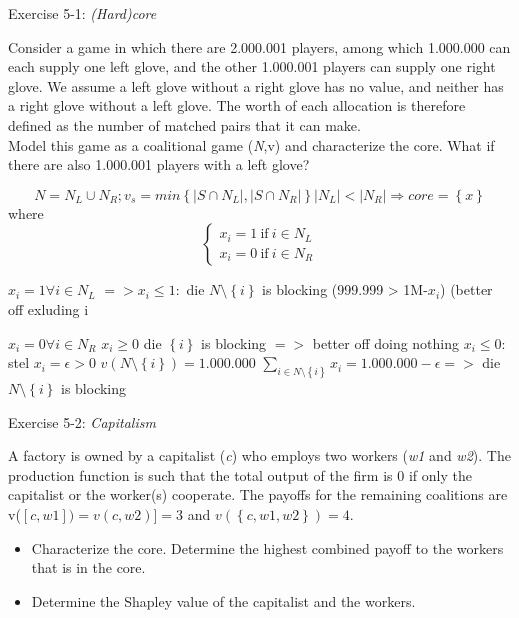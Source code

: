 \documentclass[../main.tex]{subfiles}
\begin{document}

\begin{question}
Exercise 5-1: \textit{(Hard)core}

Consider a game in which there are 2.000.001 players, among which 1.000.000 can each supply one left glove, and the other 1.000.001 players can supply one right glove. We assume a left glove without a right glove has no value, and neither has a right glove without a left glove. The worth of each allocation is therefore defined as the number of matched pairs that it can make.\\

Model this game as a coalitional game (\textit{N},v) and characterize the core. What if there are also 1.000.001 players with a left glove?

\end{question}

\begin{solution} 
\[
N = N_L \cup N_R; v_s = min \left\{ |S \cap N_L|, |S \cap N_R| \right\}
|N_L| < |N_R| \Rightarrow core = \left\{x\right\} 
\]
where 
\[
\begin{cases}
 x_i = 1 ~ \text{if} ~ i \in N_L \\
 x_i = 0 ~ \text{if} ~ i \in N_R
\end{cases}
\]


$x_i = 1 \forall i \in N_L$
$=> x_i \leq 1:$ die $N \setminus \left\{i\right\}$ is blocking (999.999 > 1M-$x_i$) (better off exluding i

$x_i = 0 \forall i \in N_R$
	$x_i \geq 0$ die $\left\{i\right\}$ is blocking $=>$ better off doing nothing
	$x_i \leq 0$: 
		stel $x_i = \epsilon > 0$
			$v(N \setminus \left\{i\right\}) = 1.000.000$
			$\sum_{i \in N\setminus\left\{i\right\}} x_i = 1.000.000 - \epsilon =>$ die $N\setminus\left\{i\right\}$ is blocking
\end{solution}

\begin{question}
    Exercise 5-2: \textit{Capitalism}

A factory is owned by a capitalist (\textit{c}) who employs two workers (\textit{w1} and \textit{w2}). The production function is such that the total output of the firm is 0 if only the capitalist or the worker(s) cooperate. The payoffs for the remaining coalitions are v($[c,w1]) = v(c,w2)] = 3$ and $v(\left\{c,w1,w2\right\})=4$.

    \begin{itemize}
        \item Characterize the core. Determine the highest combined payoff to the workers that is in the core.
        \item Determine the Shapley value of the capitalist and the workers.
    \end{itemize}
\end{question}
\end{document}
